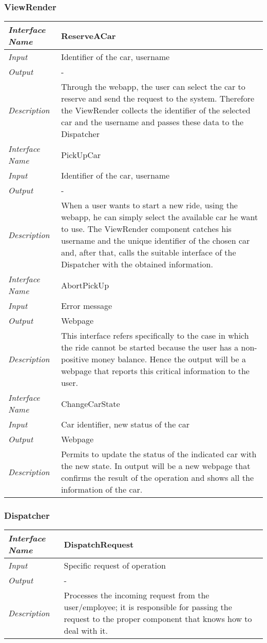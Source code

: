 \documentclass[11pt,a4paper]{report}
\begin{document}
\subsubsection{ViewRender}
\begin{tabularx}{\textwidth}{|>{\em}l|X|}
	\hline
	Interface Name& ReserveACar\\
	\hline
	Input & Identifier of the car, username\\
	\hline
	Output & -\\
	\hline
	Description &Through the webapp, the user can select the car to reserve and send the request to the system. Therefore the ViewRender collects the identifier of the selected car and the username and passes these data to the Dispatcher\\
	\hline\hline
	Interface Name& PickUpCar\\
	\hline
	Input & Identifier of the car, username\\
	\hline
	Output & -\\
	\hline
	Description &When a user wants to start a new ride, using the webapp, he can simply select the available car he want to use. The ViewRender component catches his username and the unique identifier of the chosen car and, after that, calls the suitable interface of the Dispatcher with the obtained information.\\
	\hline\hline
	Interface Name& AbortPickUp\\
	\hline
	Input & Error message\\
	\hline
	Output & Webpage\\
	\hline
	Description &This interface refers specifically to the case in which the ride cannot be started because the user has a non-positive money balance. Hence the output will be a webpage that reports this critical information to the user.\\
	\hline\hline
	Interface Name& ChangeCarState\\
	\hline
	Input & Car identifier, new status of the car\\
	\hline
	Output & Webpage\\
	\hline
	Description &Permits to update the status of the indicated car with the new state. In output will be a new webpage that confirms the result of the operation and shows all the information of the car.\\
	\hline
\end{tabularx}
\subsubsection{Dispatcher}
\begin{tabularx}{\textwidth}{|>{\em}l|X|}
	\hline
	Interface Name& DispatchRequest\\
	\hline
	Input & Specific request of operation\\
	\hline
	Output & -\\
	\hline
	Description &Processes the incoming request from the user/employee; it is responsible for passing the request to the proper component that knows how to deal with it.\\
	\hline
\end{tabularx}
\end{document}
